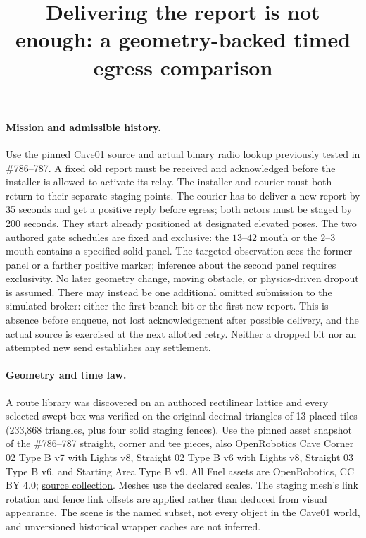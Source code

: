 \documentclass{article}
\begin{document}
\title{Delivering the report is not enough: a geometry-backed timed egress comparison}
\maketitle

\paragraph{Mission and admissible history.}
Use the pinned Cave01 source and actual binary radio lookup
previously tested in \#786--787. A fixed old report must be
received and acknowledged before the installer is allowed
to activate its relay. The installer and courier must both
return to their separate staging points. The courier has to
deliver a new report by 35 seconds and get a positive reply
before egress; both actors must be staged by 200 seconds.
They start already positioned at designated elevated poses.
The two authored gate schedules are fixed and exclusive:
the \(13\)--\(42\) mouth or the \(2\)--\(3\) mouth contains
a specified solid panel. The targeted observation sees the
former panel or a farther positive marker; inference about
the second panel requires exclusivity. No later geometry
change, moving obstacle, or physics-driven dropout is assumed.
There may instead be one additional omitted submission to the
simulated broker: either the first branch bit or the first new
report. This is absence before enqueue, not lost acknowledgement
after possible delivery, and the actual source is exercised at
the next allotted retry. Neither a dropped bit nor an attempted
new send establishes any settlement.

\paragraph{Geometry and time law.}
A route library was discovered on an authored rectilinear
lattice and every selected swept box was verified on the
original decimal triangles of 13 placed tiles
(233,868 triangles, plus four solid staging fences).
Use the pinned asset snapshot of the \#786--787 straight,
corner and tee pieces, also OpenRobotics Cave Corner 02
Type B v7 with Lights v8, Straight 02 Type B v6 with Lights
v8, Straight 03 Type B v6, and Starting Area Type B v9.
All Fuel assets are OpenRobotics, CC BY 4.0;
\href{https://fuel.gazebosim.org/1.0/OpenRobotics/models}{source collection}.
Meshes use the declared scales. The staging mesh's link
rotation and fence link offsets are applied rather than
deduced from visual appearance. The scene is the named
subset, not every object in the Cave01 world, and
unversioned historical wrapper caches are not inferred.
\end{document}
